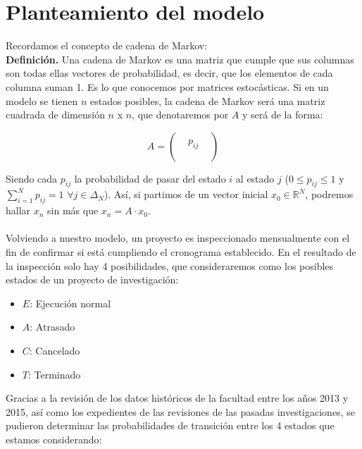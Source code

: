 \documentclass[10pt,a4paper]{article}
\begin{document}
\section{Planteamiento del modelo}
Recordamos el concepto de cadena de Markov: \\

\textbf{Definición.} Una cadena de Markov es una matriz que cumple que sus columnas son todas ellas vectores de probabilidad, es decir, que los elementos de cada columna suman 1. Es lo que conocemos por matrices estocásticas. Si en un modelo se tienen $n$ estados posibles, la cadena de Markov será una matriz cuadrada de dimensión $n$ x $n$, que denotaremos por $A$ y será de la forma:

\begin{equation}
A = 
\begin{pmatrix}
\\
& p_{ij} &\\
\\
\end{pmatrix}
\end{equation}

Siendo cada $p_{ij}$ la probabilidad de pasar del estado $i$ al estado $j$ ($0 \leq p_{ij} \leq 1$ y $\sum_{i = 1}^{N}p_{ij} = 1$ $\forall j \in \Delta_{N}$). Así, si partimos de un vector inicial $x_0 \in \mathbb R ^N$, podremos hallar $x_n$ sin más que $x_n = A \cdot x_0$.
\\
\\
Volviendo a nuestro modelo, un proyecto es inspeccionado mensualmente con el fin de confirmar si está cumpliendo el cronograma establecido. En el resultado de la inspección solo hay 4 posibilidades, que consideraremos como los posibles estados de un proyecto de investigación:

\begin{itemize}
	\item $E$: Ejecución normal
	\item $A$: Atrasado
	\item $C$: Cancelado
	\item $T$: Terminado
\end{itemize}

Gracias a la revisión de los datos históricos de la facultad entre los años 2013 y 2015, así como los expedientes de las revisiones de las pasadas investigaciones, se pudieron determinar las probabilidades de transición entre los 4 estados que estamos considerando:
\end{document}
